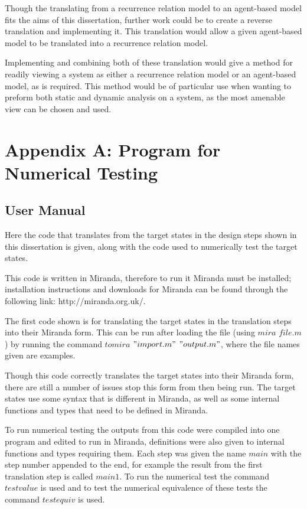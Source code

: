 \documentclass{article}
\begin{document}
Though the translating from a recurrence relation model to an agent-based model fits the aims of this dissertation, further work could be to create a reverse translation and implementing it. This translation would allow a given agent-based model to be translated into a recurrence relation model. 

Implementing and combining both of these translation would give a method for readily viewing a system as either a recurrence relation model or an agent-based model, as is required. This method would be of particular use when wanting to preform both static and dynamic analysis on a system, as the most amenable view can be chosen and used. 










\newpage 
\section*{Appendix A: Program for Numerical Testing}
\subsection*{User Manual}
Here the code that translates from the target states in the design steps shown in this dissertation is given, along with the code used to numerically test the target states.

This code is written in Miranda, therefore to run it Miranda must be installed; installation instructions and downloads for Miranda can be found through the following link: http://miranda.org.uk/. 

The first code shown is for translating the target states in the translation steps into their Miranda form. This can be run after loading the file (using $mira$ $file.m$) by running the command  $tomira$ $"import.m"$ $"output.m"$, where the file names given are examples. 

Though this code correctly translates the target states into their Miranda form, there are still a number of issues stop this form from then being run. The target states use some syntax that is different in Miranda, as well as some internal functions and types that need to be defined in Miranda. 

To run numerical testing the outputs from this code were compiled into one program and edited to run in Miranda, definitions were also given to internal functions and types requiring them. Each step was given the name $main$ with the step number appended to the end, for example the result from the first translation step is called $main1$. To run the numerical test the command $testvalue$ is used and to test the numerical equivalence of these tests the command $testequiv$ is used. 
\end{document}
